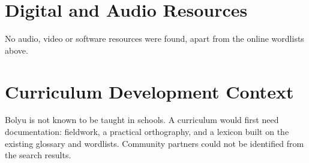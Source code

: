 \documentclass[12pt]{article}
\begin{document}
\section{Digital and Audio Resources}
No audio, video or software resources were found, apart from the online wordlists above.

\section{Curriculum Development Context}
Bolyu is not known to be taught in schools. A curriculum would first need documentation: fieldwork, a practical orthography, and a lexicon built on the existing glossary and wordlists. Community partners could not be identified from the search results.
\end{document}
